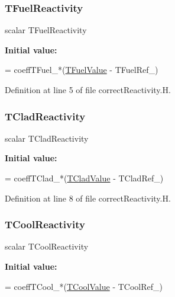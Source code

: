 \subsubsection{\texorpdfstring{T\+Fuel\+Reactivity}{TFuelReactivity}}
{\footnotesize\ttfamily scalar T\+Fuel\+Reactivity}

{\bfseries Initial value\+:}
\begin{DoxyCode}
=
    coeffTFuel\_*(\hyperlink{computeFeedbackFieldValues_8H_ac4077c55a765b52fa94f1ed80f0aa27f}{TFuelValue} - TFuelRef\_)
\end{DoxyCode}


Definition at line 5 of file correct\+Reactivity.\+H.

\mbox{\label{correctReactivity_8H_a7383c4c5d0651354b624fec6754739a7}} 
\subsubsection{\texorpdfstring{T\+Clad\+Reactivity}{TCladReactivity}}
{\footnotesize\ttfamily scalar T\+Clad\+Reactivity}

{\bfseries Initial value\+:}
\begin{DoxyCode}
=
    coeffTClad\_*(\hyperlink{computeFeedbackFieldValues_8H_a29801690652bbcb1415a8e90df6bc6fd}{TCladValue} - TCladRef\_)
\end{DoxyCode}


Definition at line 8 of file correct\+Reactivity.\+H.

\mbox{\label{correctReactivity_8H_a2f8900e0caab4a682522f17af1ec8c1d}} 
\subsubsection{\texorpdfstring{T\+Cool\+Reactivity}{TCoolReactivity}}
{\footnotesize\ttfamily scalar T\+Cool\+Reactivity}

{\bfseries Initial value\+:}
\begin{DoxyCode}
=
    coeffTCool\_*(\hyperlink{computeFeedbackFieldValues_8H_ad97890bb5f696e1ed4c20e854caf6e62}{TCoolValue} - TCoolRef\_)
\end{DoxyCode}


